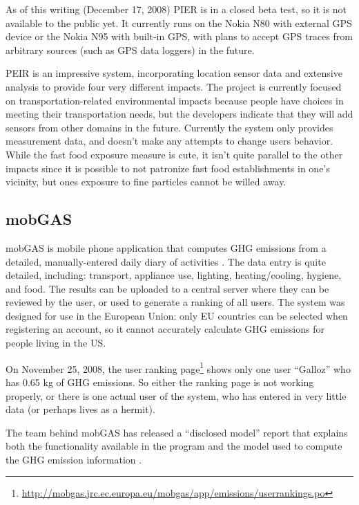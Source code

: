 As of this writing (December 17, 2008) PIER is in a closed beta test, so it is not available to the public yet. It currently runs on the Nokia N80 with external GPS device or the Nokia N95 with built-in GPS, with plans to accept GPS traces from arbitrary sources (such as GPS data loggers) in the future.

PEIR is an impressive system, incorporating location sensor data and extensive analysis to provide four very different impacts. The project is currently focused on transportation-related environmental impacts because people have  choices in meeting their transportation needs, but the developers indicate that they will add sensors from other domains in the future. Currently the system only provides measurement data, and doesn't make any attempts to change users behavior. While the fast food exposure measure is cute, it isn't quite parallel to the other impacts since it is possible to not patronize fast food establishments in one's vicinity, but ones exposure to fine particles cannot be willed away.

\subsection{mobGAS}

mobGAS is mobile phone application that computes GHG emissions from a detailed, manually-entered daily diary of activities \cite{mobGAS-website}. The data entry is quite detailed, including: transport, appliance use, lighting, heating/cooling, hygiene, and food. The results can be uploaded to a central server where they can be reviewed by the user, or used to generate a ranking of all users. The system was designed for use in the European Union: only EU countries can be selected when registering an account,  so it cannot accurately calculate GHG emissions for people living in the US.

On November 25, 2008, the user ranking page\footnote{\url{http://mobgas.jrc.ec.europa.eu/mobgas/app/emissions/userrankings.po}} shows only one user ``Galloz'' who has 0.65 kg of GHG emissions. So either the ranking page is not working properly, or there is one actual user of the system, who has entered in very little data (or perhaps lives as a hermit).

The team behind mobGAS has released a ``disclosed model'' report that explains both the functionality available in the program and the model used to compute the GHG emission information \cite{Sousa-Pedrosa2008mobGAS-model}.

